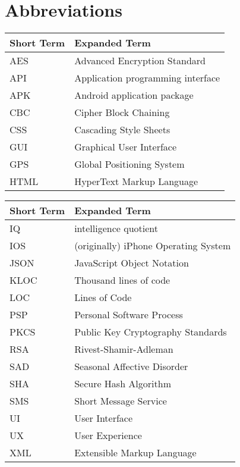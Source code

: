 \chapter{Abbreviations}

\begin{tabular}{p{40mm}|p{100mm}}
	\textbf{Short Term}&\textbf{Expanded Term}\\
	\hline
	
	AES		& Advanced Encryption Standard\\	
	API		& Application programming interface\\
	APK		& Android application package\\
	
	CBC 		& Cipher Block Chaining\\	
	CSS 		& Cascading Style Sheets\\
	
	GUI		& Graphical User Interface\\
	GPS		& Global Positioning System\\
	
	HTML 	& HyperText Markup Language\\


\end{tabular}

\begin{tabular}{p{40mm}|p{100mm}}
	\textbf{Short Term}&\textbf{Expanded Term}\\
	\hline

	IQ			& intelligence quotient\\
	IOS 		& (originally) iPhone Operating System\\
	
	JSON 	& JavaScript Object Notation\\

	KLOC	&	Thousand lines of code\\
	
	LOC		&	Lines of Code\\

	PSP		& 	Personal Software Process\\	
	
	PKCS 	& Public Key Cryptography Standards\\
	RSA		& Rivest-Shamir-Adleman\\
	
	SAD 		& Seasonal Affective Disorder\\
	SHA 		& Secure Hash Algorithm\\
	SMS 		& Short Message Service\\
	
	UI			& User Interface\\
	UX 		& User Experience\\	
	
	XML		& Extensible Markup Language\\

\end{tabular}